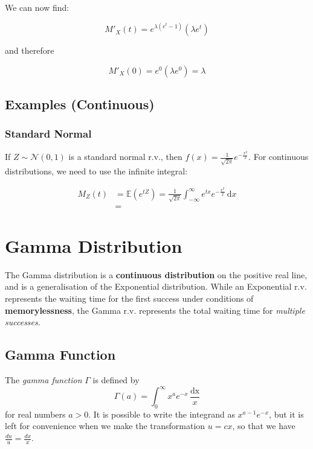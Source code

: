 \documentclass{article}
\begin{document}
\noindent We can now find:

\begin{equation*}
    M'_X (t) = e^{\lambda(e^{t} - 1)}(\lambda e^{t})
\end{equation*}

\noindent and therefore 

\begin{equation*}
    M'_X (0) = e^{0} (\lambda e^{0}) = \lambda
\end{equation*}

\subsection{Examples (Continuous)}

\subsubsection{Standard Normal}

If $Z \sim \mathcal{N}(0,1)$ is a standard normal r.v., then $f(x) = \frac{1}{\sqrt{2\pi}} e^{-\frac{x^{2}}{2}}$. For continuous distributions, we need to use the infinite integral:

\begin{align}
    M_Z(t) &= \mathbb{E}(e^{tZ}) = \frac{1}{\sqrt{2\pi}} \int_{-\infty}^{\infty} e^{tx} e^{-\frac{x^{2}}{2}} \, \mathrm{d}x \\ 
    &=  
\end{align}

\section{Gamma Distribution}
The Gamma distribution is a \textbf{continuous distribution} on the positive real line, and is a generalisation of the Exponential distribution. While an Exponential r.v. represents the waiting time for the first success under conditions of \textbf{memorylessness}, the Gamma r.v. represents the total waiting time for \textit{multiple successes}. 

\subsection{Gamma Function}

\begin{definition}
    The \textit{gamma function} $\Gamma$ is defined by \begin{equation}
        \Gamma (a) = \int_{0}^{\infty} x^{a}e^{-x} \, \frac{\mathrm{dx}}{x}
    \end{equation} for real numbers $a> 0$. It is possible to write the integrand as $x^{a-1}e^{-x}$, but it is left for convenience when we make the transformation $u = cx$, so that we have $\frac{du}{u} = \frac{dx}{x}$. 
\end{definition}
\end{document}
